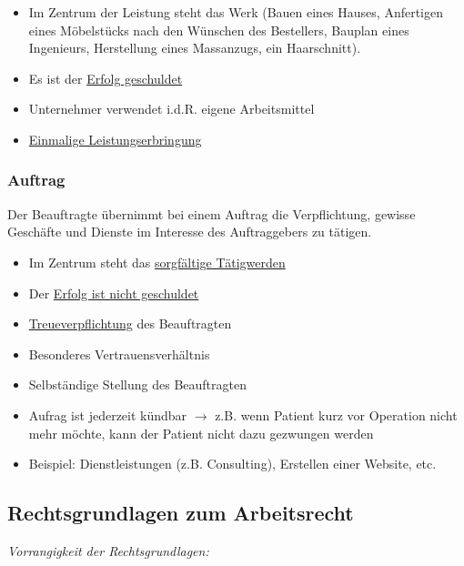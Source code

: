 \begin{itemize}
    \item Im Zentrum der Leistung steht das Werk (Bauen eines Hauses, Anfertigen eines Möbelstücks nach den Wünschen des Bestellers, Bauplan eines Ingenieurs, Herstellung eines Massanzugs, ein Haarschnitt).
    \item Es ist der \underline{Erfolg geschuldet}
    \item Unternehmer verwendet i.d.R. eigene Arbeitsmittel
    \item \underline{Einmalige Leistungserbringung}
\end{itemize}

\subsubsection{Auftrag}
\label{arbeitsrecht:auftrag}
Der Beauftragte übernimmt bei einem Auftrag die Verpflichtung, gewisse Geschäfte und Dienste im Interesse des Auftraggebers zu tätigen.

\begin{itemize}
    \item Im Zentrum steht das \underline{sorgfältige Tätigwerden}
    \item Der \underline{Erfolg ist nicht geschuldet}
    \item \underline{Treueverpflichtung} des Beauftragten
    \item Besonderes Vertrauensverhältnis
    \item Selbständige Stellung des Beauftragten
    \item Aufrag ist jederzeit kündbar $\rightarrow$ z.B. wenn Patient kurz vor Operation nicht mehr möchte, kann der Patient nicht dazu gezwungen werden
    \item Beispiel: Dienstleistungen (z.B. Consulting), Erstellen einer Website, etc.
\end{itemize}

\subsection{Rechtsgrundlagen zum Arbeitsrecht}
\textit{Vorrangigkeit der Rechtsgrundlagen:} 

